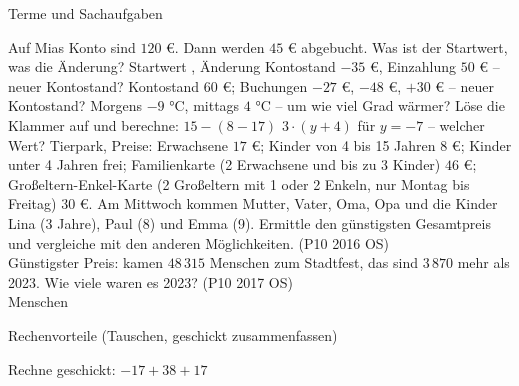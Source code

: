 \setcounter{aufgabe}{22}

\begin{aufgabe}{Terme und Sachaufgaben}
\begin{teile}
\teil Auf Mias Konto sind $120$ €. Dann werden $45$ € abgebucht. Was ist der Startwert, was die Änderung? Startwert \leerfeld , Änderung \leerfeld
\teil Kontostand $-35$ €, Einzahlung $50$ € – neuer Kontostand? \leerfeld[€]
\teil Kontostand $60$ €; Buchungen $-27$ €, $-48$ €, $+30$ € – neuer Kontostand? \leerfeld[€]
\teil Morgens $-9$ °C, mittags $4$ °C – um wie viel Grad wärmer? \leerfeld[Grad]
\teil Löse die Klammer auf und berechne: $15 - (8 - 17)$ \leerfeld
\teil $3 \cdot (y + 4)$ für $y = -7$ – welcher Wert? \leerfeld
\teil Tierpark, Preise: Erwachsene $17$ €; Kinder von 4 bis 15 Jahren $8$ €; Kinder unter 4 Jahren frei; Familienkarte (2 Erwachsene und bis zu 3 Kinder) $46$ €; Großeltern-Enkel-Karte (2 Großeltern mit 1 oder 2 Enkeln, nur Montag bis Freitag) $30$ €. Am Mittwoch kommen Mutter, Vater, Oma, Opa und die Kinder Lina (3 Jahre), Paul (8) und Emma (9). Ermittle den günstigsten Gesamtpreis und vergleiche mit den anderen Möglichkeiten. \hfill (P10 2016 OS) \\ Günstigster Preis: \leerfeld[€]
 kamen $48\,315$ Menschen zum Stadtfest, das sind $3\,870$ mehr als 2023. Wie viele waren es 2023? \hfill (P10 2017 OS) \\ \leerfeld Menschen
\end{teile}
\end{aufgabe}

\begin{aufgabe}{Rechenvorteile (Tauschen, geschickt zusammenfassen)}
\begin{teile}
\teil Rechne geschickt: $-17 + 38 + 17$ \leerfeld
\end{teile}
\end{aufgabe}

